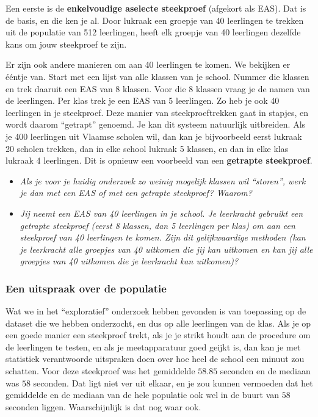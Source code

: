 \documentclass[11pt]{article}
\newcommand{\vraag}[2]{\begin{itemize}\item {\it #1} \vspace*{#2}\end{itemize}}
\begin{document}
Een eerste is de {\bf enkelvoudige aselecte steekproef} (afgekort als EAS). Dat is de basis, en die ken je
al. Door lukraak een groepje van 40 leerlingen te trekken uit de populatie van 512 leerlingen, heeft
elk groepje van 40 leerlingen dezelfde kans om jouw steekproef te zijn.


Er zijn ook andere manieren om aan 40 leerlingen te komen. We bekijken er ééntje van.
Start met een lijst van alle klassen van je school. Nummer die klassen en trek daaruit een EAS van 8
klassen. Voor die 8 klassen vraag je de namen van de leerlingen. Per klas trek je een EAS van 5
leerlingen. Zo heb je ook 40 leerlingen in je steekproef. Deze manier van steekproeftrekken gaat in
stapjes, en wordt daarom “getrapt” genoemd. Je kan dit systeem natuurlijk uitbreiden. Als je 400
leerlingen uit Vlaamse scholen wil, dan kan je bijvoorbeeld eerst lukraak 20 scholen trekken, dan in
elke school lukraak 5 klassen, en dan in elke klas lukraak 4 leerlingen. Dit is opnieuw een voorbeeld
van een {\bf getrapte steekproef}.

\vraag{Als je voor je huidig onderzoek zo weinig mogelijk klassen wil “storen”, werk je dan met een
EAS of met een getrapte steekproef? Waarom?}{3cm}

\vraag{Jij neemt een EAS van 40 leerlingen in je school. Je leerkracht gebruikt een getrapte
steekproef (eerst 8 klassen, dan 5 leerlingen per klas) om aan een steekproef van 40
leerlingen te komen. Zijn dit gelijkwaardige methoden (kan je leerkracht alle groepjes van 40
uitkomen die jij kan uitkomen en kan jij alle groepjes van 40 uitkomen die je leerkracht kan
uitkomen)?}{5cm}

\subsubsection{Een uitspraak over de populatie}

Wat we in het “exploratief” onderzoek hebben gevonden is van toepassing op de dataset die we hebben
onderzocht, en dus op alle leerlingen van de klas. Als je op een goede manier een steekproef trekt, als je je
strikt houdt aan de procedure om de leerlingen te testen, en als je meetapparatuur goed geijkt is, dan
kan je met statistiek verantwoorde uitspraken doen over hoe heel de school een minuut zou schatten.
Voor deze steekproef was het gemiddelde $58.85$ seconden en de mediaan was $58$ seconden. Dat ligt
niet ver uit elkaar, en je zou kunnen vermoeden dat het gemiddelde en de mediaan van de hele
populatie ook wel in de buurt van $58$ seconden liggen. Waarschijnlijk is dat nog waar ook.
\end{document}
